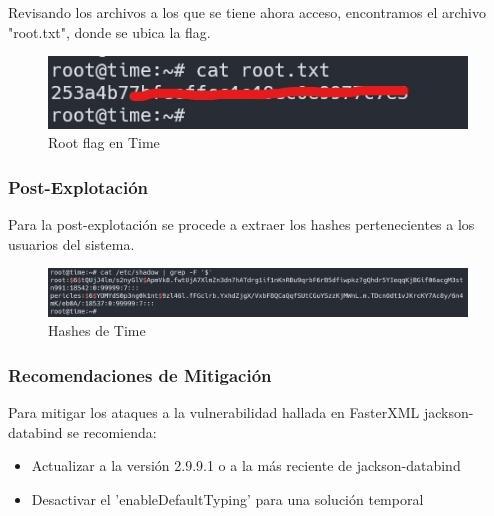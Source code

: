         \large{Revisando los archivos a los que se tiene ahora acceso, encontramos el archivo "root.txt", donde se ubica la flag.}
        \par
        \begin{figure}[H]
            \centering
            \includegraphics[width=0.99\textwidth]{imagenes/time/16_root_flag_time.jpg}
            \caption{Root flag en Time}
        \end{figure}

    \subsubsection{Post-Explotación}

        \large{Para la post-explotación se procede a extraer los hashes pertenecientes a los usuarios del sistema.}
        \par
        \begin{figure}[H]
            \centering
            \includegraphics[width=0.99\textwidth]{imagenes/time/17_hashes_time.png}
            \caption{Hashes de Time}
        \end{figure}

    \subsubsection{Recomendaciones de Mitigación}

    \large{Para mitigar los ataques a la vulnerabilidad hallada en FasterXML jackson-databind se recomienda:}
    \begin{itemize}
        \item Actualizar a la versión 2.9.9.1 o a la más reciente de jackson-databind
        \item Desactivar el 'enableDefaultTyping' para una solución temporal
    \end{itemize}
